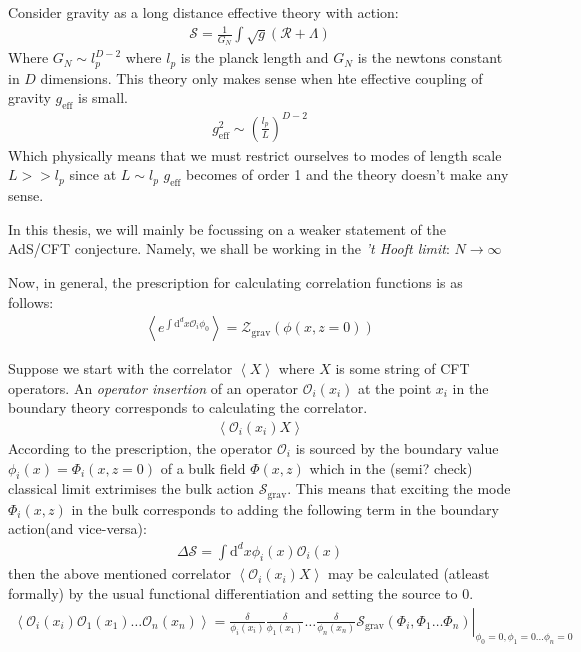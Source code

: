   Consider gravity as a long distance effective theory with action:
  \begin{align*}
   \mathcal{S} = \frac{1}{G_N} \int \sqrt{g} (\mathcal{R} + \Lambda)
  \end{align*}
  Where $G_N \sim l_p^{D-2}$ where $l_p$ is the planck length and $G_N$ is the newtons constant in $D$ dimensions. This theory only makes sense when hte effective coupling of gravity $g_\text{eff}$ is small. 
  \begin{align*}
   g_\text{eff}^2 \sim \left( \frac{l_p}{L} \right)^{D-2} 
  \end{align*}
  Which physically means that we must restrict ourselves to modes of length scale $L >> l_p$ since at $L \sim l_p$ $g_\text{eff}$ becomes of order 1 and the theory doesn't make any sense.
  
  In this thesis, we will mainly be focussing on a weaker statement of the AdS/CFT conjecture. Namely, we shall be working in the  \emph{'t Hooft limit}: $N \rightarrow \infty$ 
  
  
  Now, in general, the prescription for calculating correlation functions is as follows:
  \begin{align*}
   \left\langle e^{\int \mathrm{d}^d x \mathcal{O}_i \phi_0 }\right\rangle = \mathcal{Z}_\text{grav} (\phi(x,z=0))
  \end{align*}
  
  Suppose we start with the correlator $\left\langle X \right\rangle$ where $X$ is some string of CFT operators. An \emph{operator insertion} of an operator $\mathcal{O}_i(x_i)$ at the point $x_i$ in the boundary theory corresponds to calculating the correlator.
  \begin{align*}
   \left\langle \mathcal{O}_i(x_i)X\right\rangle
  \end{align*}
  According to the prescription, the operator $\mathcal{O}_i$ is sourced by the boundary value $\phi_i(x)=\Phi_i(x,z=0)$ of a bulk field $\Phi(x,z)$ which in the (semi? check) classical limit extrimises the bulk action $\mathcal{S}_\text{grav}$. This means that exciting the mode $\Phi_i(x,z)$ in the bulk corresponds to adding the following term in the boundary action(and vice-versa):
  \begin{align*}
   \Delta\mathcal{S}= \int \mathrm{d}^dx \phi_i (x) \mathcal{O}_i(x)
  \end{align*}
  then the above mentioned correlator $\left\langle \mathcal{O}_i(x_i)X\right\rangle$ may be calculated (atleast formally) by the usual functional differentiation and setting the source to 0.
  \begin{align*}
   \left\langle \mathcal{O}_i(x_i)\mathcal{O}_1(x_1) \dots \mathcal{O}_n(x_n)\right\rangle = \left. \frac{\delta}{\phi_i(x_i)}\frac{\delta}{\phi_1(x_1)}\dots\frac{\delta}{\phi_n(x_n)} \mathcal{S}_\text{grav}(\Phi_i,\Phi_1\dots\Phi_n) \right|_{\phi_0=0,\phi_1=0\dots\phi_n=0}
  \end{align*}


